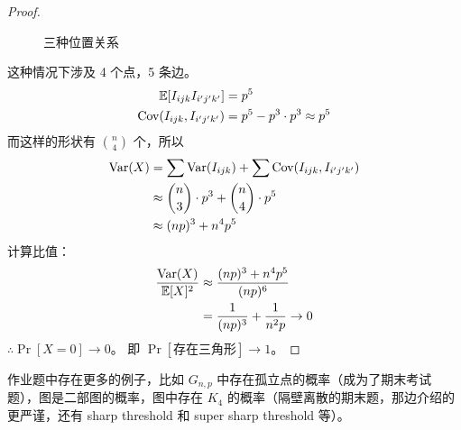 \begin{proof}
\begin{figure}[htbp]
        \caption{三种位置关系}
    \end{figure}
    
    这种情况下涉及 4 个点，5 条边。
    \begin{align*}
        \mathbb{E}[I_{ijk}I_{i^{\prime}j^{\prime}k^{\prime}}] &= p^{5} \\
        \text{Cov}(I_{ijk}, I_{i^{\prime}j^{\prime}k^{\prime}}) &= p^{5} - p^{3} \cdot p^{3} \approx p^{5}
    \end{align*}
    而这样的形状有 $\binom{n}{4}$ 个，所以
    \begin{align*}
        \text{Var}(X) &= \sum \text{Var}(I_{ijk}) + \sum \text{Cov}(I_{ijk}, I_{i^{\prime}j^{\prime}k^{\prime}}) \\
        &\approx \binom{n}{3} \cdot p^{3} + \binom{n}{4} \cdot p^{5} \\
        &\approx (np)^{3} + n^{4}p^{5}
    \end{align*}
    计算比值：
    \begin{align*}
        \frac{\text{Var}(X)}{\mathbb{E}[X]^{2}} &\approx \frac{(np)^{3} + n^{4}p^{5}}{(np)^{6}} \\
        &= \frac{1}{(np)^3} + \frac{1}{n^2 p} \to 0
    \end{align*}
    $\therefore \Pr[X=0] \to 0$。
    即 $\Pr[\text{存在三角形}] \to 1$。
\end{proof}

作业题中存在更多的例子，比如 $G_{n,p}$ 中存在孤立点的概率（成为了期末考试题），图是二部图的概率，图中存在 $K_4$ 的概率（隔壁离散的期末题，那边介绍的更严谨，还有 sharp threshold 和 super sharp threshold 等）。